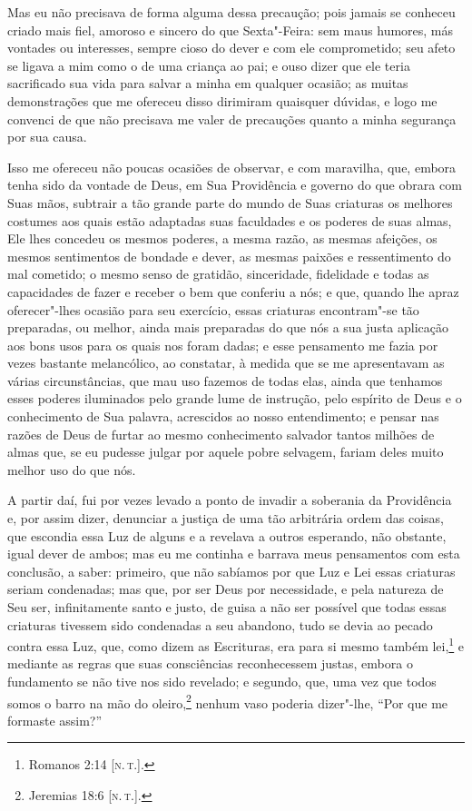 Mas eu não precisava de forma alguma dessa precaução; pois jamais se
conheceu criado mais fiel, amoroso e sincero do que Sexta"-Feira: sem
maus humores, más vontades ou interesses, sempre cioso do dever e com
ele comprometido; seu afeto se ligava a mim como o de uma criança ao
pai; e ouso dizer que ele teria sacrificado sua vida para salvar a minha
em qualquer ocasião; as muitas demonstrações que me ofereceu disso
dirimiram quaisquer dúvidas, e logo me convenci de que não precisava me
valer de precauções quanto a minha segurança por sua causa.

Isso me ofereceu não poucas ocasiões de observar, e com maravilha, que,
embora tenha sido da vontade de Deus, em Sua Providência e governo do
que obrara com Suas mãos, subtrair a tão grande parte do mundo de Suas
criaturas os melhores costumes aos quais estão adaptadas suas faculdades
e os poderes de suas almas, Ele lhes concedeu os mesmos poderes, a mesma
razão, as mesmas afeições, os mesmos sentimentos de bondade e dever, as
mesmas paixões e ressentimento do mal cometido; o mesmo senso de
gratidão, sinceridade, fidelidade e todas as capacidades de fazer e
receber o bem que conferiu a nós; e que, quando lhe apraz oferecer"-lhes
ocasião para seu exercício, essas criaturas encontram"-se tão preparadas,
ou melhor, ainda mais preparadas do que nós a sua justa aplicação aos
bons usos para os quais nos foram dadas; e esse pensamento me fazia por
vezes bastante melancólico, ao constatar, à medida que se me
apresentavam as várias circunstâncias, que mau uso fazemos de todas
elas, ainda que tenhamos esses poderes iluminados pelo grande lume de
instrução, pelo espírito de Deus e o conhecimento de Sua palavra,
acrescidos ao nosso entendimento; e pensar nas razões de Deus de furtar
ao mesmo conhecimento salvador tantos milhões de almas que, se eu
pudesse julgar por aquele pobre selvagem, fariam deles muito melhor uso
do que nós.

A partir daí, fui por vezes levado a ponto de invadir a soberania da
Providência e, por assim dizer, denunciar a justiça de uma tão
arbitrária ordem das coisas, que escondia essa Luz de alguns e a
revelava a outros esperando, não obstante, igual dever de ambos; mas eu
me continha e barrava meus pensamentos com esta conclusão, a saber:
primeiro, que não sabíamos por que Luz e Lei essas criaturas seriam
condenadas; mas que, por ser Deus por necessidade, e pela natureza de
Seu ser, infinitamente santo e justo, de guisa a não ser possível que
todas essas criaturas tivessem sido condenadas a seu abandono, tudo se
devia ao pecado contra essa Luz, que, como dizem as Escrituras, era para
si mesmo também lei,\footnote{Romanos 2:14 {[}\textsc{n.\,t.}{]}.} e mediante as
regras que suas consciências reconhecessem justas, embora o fundamento
se não tive nos sido revelado; e segundo, que, uma vez que todos somos o
barro na mão do oleiro,\footnote{Jeremias 18:6 {[}\textsc{n.\,t.}{]}.} nenhum vaso
poderia dizer"-lhe, ``Por que me formaste assim?''

